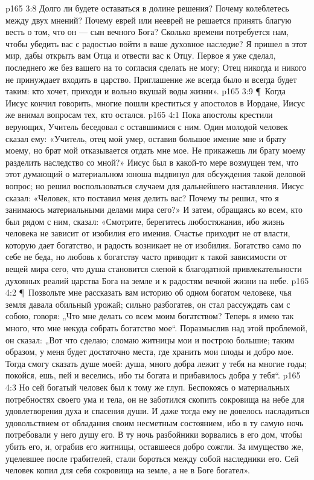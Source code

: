 \vs p165 3:8 Долго ли будете оставаться в долине решения? Почему колеблетесь между двух мнений? Почему еврей или нееврей не решается принять благую весть о том, что он --- сын вечного Бога? Сколько времени потребуется нам, чтобы убедить вас с радостью войти в ваше духовное наследие? Я пришел в этот мир, дабы открыть вам Отца и отвести вас к Отцу. Первое я уже сделал, последнего же без вашего на то согласия сделать не могу; Отец никогда и никого не принуждает входить в царство. Приглашение же всегда было и всегда будет таким: кто хочет, приходи и вольно вкушай воды жизни».
\vs p165 3:9 \P\ Когда Иисус кончил говорить, многие пошли креститься у апостолов в Иордане, Иисус же внимал вопросам тех, кто остался.
\vs p165 4:1 Пока апостолы крестили верующих, Учитель беседовал с оставшимися с ним. Один молодой человек сказал ему: «Учитель, отец мой умер, оставив большое имение мне и брату моему, но брат мой отказывается отдать мне мое. Не прикажешь ли брату моему разделить наследство со мной?» Иисус был в какой\hyp{}то мере возмущен тем, что этот думающий о материальном юноша выдвинул для обсуждения такой деловой вопрос; но решил воспользоваться случаем для дальнейшего наставления. Иисус сказал: «Человек, кто поставил меня делить вас? Почему ты решил, что я занимаюсь материальными делами мира сего?» И затем, обращаясь ко всем, кто был рядом с ним, сказал: «Смотрите, берегитесь любостяжания, ибо жизнь человека не зависит от изобилия его имения. Счастье приходит не от власти, которую дает богатство, и радость возникает не от изобилия. Богатство само по себе не беда, но любовь к богатству часто приводит к такой зависимости от вещей мира сего, что душа становится слепой к благодатной привлекательности духовных реалий царства Бога на земле и к радостям вечной жизни на небе.
\vs p165 4:2 \P\ Позвольте мне рассказать вам историю об одном богатом человеке, чья земля давала обильный урожай; сильно разбогатев, он стал рассуждать сам с собою, говоря: „Что мне делать со всем моим богатством? Теперь я имею так много, что мне некуда собрать богатство мое“. Поразмыслив над этой проблемой, он сказал: „Вот что сделаю; сломаю житницы мои и построю большие; таким образом, у меня будет достаточно места, где хранить мои плоды и добро мое. Тогда смогу сказать душе моей: душа, много добра лежит у тебя на многие годы; покойся, ешь, пей и веселись, ибо ты богата и прибавилось добра у тебя“.
\vs p165 4:3 Но сей богатый человек был к тому же глуп. Беспокоясь о материальных потребностях своего ума и тела, он не заботился скопить сокровища на небе для удовлетворения духа и спасения души. И даже тогда ему не довелось насладиться удовольствием от обладания своим несметным состоянием, ибо в ту самую ночь потребовали у него душу его. В ту ночь разбойники ворвались в его дом, чтобы убить его, и, ограбив его житницы, оставшееся добро сожгли. За имущество же, уцелевшее после грабителей, стали бороться между собой наследники его. Сей человек копил для себя сокровища на земле, а не в Боге богател».
